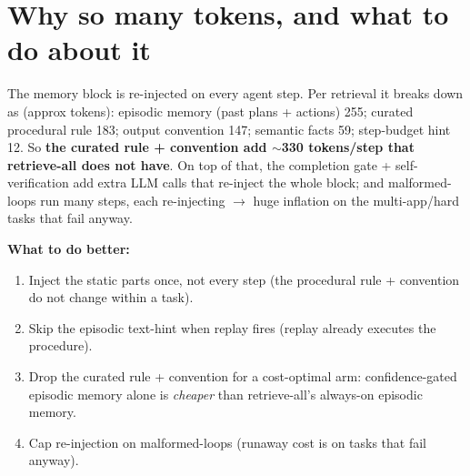 \documentclass[11pt]{article}
\begin{document}
\section{Why so many tokens, and what to do about it}
The memory block is re-injected on every agent step. Per retrieval it breaks down as (approx tokens):
episodic memory (past plans + actions) 255; curated procedural rule 183; output convention 147; semantic
facts 59; step-budget hint 12. So \textbf{the curated rule + convention add $\sim$330 tokens/step that
retrieve-all does not have}. On top of that, the completion gate + self-verification add extra LLM calls
that re-inject the whole block; and malformed-loops run many steps, each re-injecting $\to$ huge inflation
on the multi-app/hard tasks that fail anyway.

\textbf{What to do better:}
\begin{enumerate}[leftmargin=1.5em,itemsep=1pt]
\item Inject the static parts once, not every step (the procedural rule + convention do not change within a task).
\item Skip the episodic text-hint when replay fires (replay already executes the procedure).
\item Drop the curated rule + convention for a cost-optimal arm: confidence-gated episodic memory alone is
\emph{cheaper} than retrieve-all's always-on episodic memory.
\item Cap re-injection on malformed-loops (runaway cost is on tasks that fail anyway).
\end{enumerate}

\end{document}
